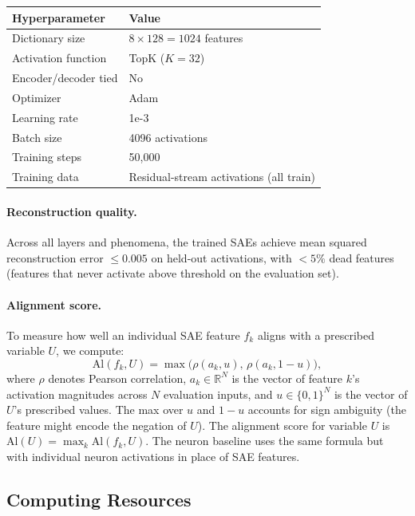 \documentclass[11pt]{article}
\begin{document}
\begin{center}
\footnotesize
\setlength{\tabcolsep}{3pt}
\begin{tabular}{@{}ll@{}}
\toprule
\textbf{Hyperparameter} & \textbf{Value} \\
\midrule
Dictionary size       & $8 \times 128 = 1024$ features \\
Activation function   & TopK ($K = 32$) \\
Encoder/decoder tied  & No \\
Optimizer             & Adam \\
Learning rate         & 1e-3 \\
Batch size            & 4096 activations \\
Training steps        & 50{,}000 \\
Training data         & Residual-stream activations (all train) \\
\bottomrule
\end{tabular}
\end{center}

\paragraph{Reconstruction quality.}
Across all layers and phenomena, the trained SAEs achieve mean squared reconstruction error $\leq 0.005$ on held-out activations, with $< 5\%$ dead features (features that never activate above threshold on the evaluation set).

\paragraph{Alignment score.}
To measure how well an individual SAE feature $f_k$ aligns with a prescribed variable $U$, we compute:
\[
\mathrm{Al}(f_k, U) {=} \max\!\big(\rho(a_k, u),\, \rho(a_k, 1{-}u)\big),
\]
where $\rho$ denotes Pearson correlation, $a_k \in \mathbb{R}^N$ is the vector of feature $k$'s activation magnitudes across $N$ evaluation inputs, and $u \in \{0,1\}^N$ is the vector of $U$'s prescribed values.
The max over $u$ and $1{-}u$ accounts for sign ambiguity (the feature might encode the negation of $U$).
The alignment score for variable $U$ is $\mathrm{Al}(U) = \max_k \mathrm{Al}(f_k, U)$.
The neuron baseline uses the same formula but with individual neuron activations in place of SAE features.

\subsection{Computing Resources}
\label{app:compute}
\end{document}
